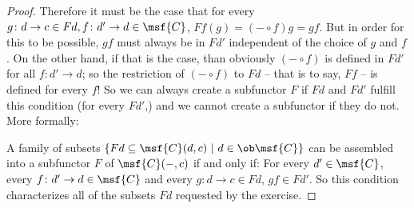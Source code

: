 \documentclass[main,tex]{subfiles}
\begin{document}
\begin{proof}
		Therefore it must be the case that for every \(g \colon d 
		\to c \in Fd, f \colon d' \to d \in \msf{C}\), \(Ff(g) = (- \circ f)g = 
		gf\). But in order for this to be possible, \(gf\) must always be in 
		\(Fd'\) independent of the choice of \(g\) and \(f\). On the other 
		hand, if 
		that is the case, than obviously \((- \circ f)\) is defined in 
		\(Fd'\) for all \(f \colon d' \to d\); so the restriction of \((- \circ 
		f)\) to \(Fd\) -- that is to say, \(Ff\) -- is defined for every \(f\)! 
		So we can always create a subfunctor \(F\) if \(Fd\) and \(Fd'\) 
		fulfill this condition (for every \(Fd'\),) and we cannot create a 
		subfunctor if they do not.  More formally:
		
		A family of subsets \(\{Fd \subseteq \msf{C}(d, c) \ | \ d \in 
		\ob\msf{C}\}\) can be assembled into a subfunctor \(F\) of 
		\(\msf{C}(-,c)\) if and only if: For every \(d' \in \msf{C}\), every 
		\(f \colon d' \to d \in \msf{C}\) and every \(g \colon d \to c \in 
		Fd\), \(gf \in Fd'\). So this condition characterizes all of the 
		subsets \(Fd\) requested by the exercise.
	\end{proof}
	
\end{document}

